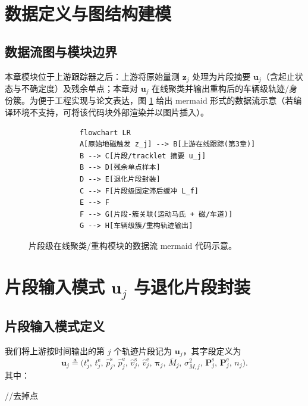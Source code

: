 \documentclass{xdupgthesis}
\begin{document}
\section{数据定义与图结构建模}

\subsection{数据流图与模块边界}
本章模块位于上游跟踪器之后：上游将原始量测 $\mathbf{z}_j$ 处理为片段摘要 $\mathbf{u}_j$（含起止状态与不确定度）及残余单点；本章对 $\mathbf{u}_j$ 在线聚类并输出重构后的车辆级轨迹/身份簇。为便于工程实现与论文表达，图 \ref{fig:mermaid_flow_frag} 给出 mermaid 形式的数据流示意（若编译环境不支持，可将该代码块外部渲染并以图片插入）。

\begin{figure}[htbp]
	\centering
	\begin{minipage}{0.92\linewidth}
		\begin{verbatim}
			flowchart LR
			A[原始地磁触发 z_j] --> B[上游在线跟踪(第3章)]
			B --> C[片段/tracklet 摘要 u_j]
			B --> D[残余单点样本]
			D --> E[退化片段封装]
			C --> F[片段级固定滞后缓冲 L_f]
			E --> F
			F --> G[片段-簇关联(运动马氏 + 磁/车道)]
			G --> H[车辆级簇/重构轨迹输出]
		\end{verbatim}
	\end{minipage}
	\caption{片段级在线聚类/重构模块的数据流 mermaid 代码示意。}
	\label{fig:mermaid_flow_frag}
\end{figure}

\section{片段输入模式 $\mathbf{u}_j$ 与退化片段封装}
\subsection{片段输入模式定义}
我们将上游按时间输出的第 $j$ 个轨迹片段记为 $\mathbf{u}_j$，其字段定义为
\begin{equation}
	\mathbf{u}_j \triangleq
	\Big(
	t_j^{\mathrm{s}},\, t_j^{\mathrm{e}},\,
	\hat p_j^{\mathrm{s}},\, \hat p_j^{\mathrm{e}},\,
	\hat v_j^{\mathrm{s}},\, \hat v_j^{\mathrm{e}},\,
	\boldsymbol{\pi}_j,\,
	\bar M_j,\, \sigma_{M,j}^2,\,
	\mathbf{P}_j^{\mathrm{s}},\, \mathbf{P}_j^{\mathrm{e}},\,
	n_j
	\Big).
	\tag{4-1}
\end{equation}
其中：

//去掉点
\end{document}

